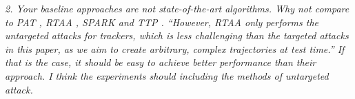 \documentclass[12pt]{article}
\begin{document}

\textit{2. Your baseline approaches are not state-of-the-art algorithms. Why not compare to PAT \cite{PAT}, RTAA \cite{RTAA}, SPARK \cite{SPARK} and TTP \cite{TTP}. “However, RTAA only performs the untargeted attacks for trackers, which is less challenging than the targeted attacks in this paper, as we aim to create arbitrary, complex trajectories at test time.” If that is the case, it should be easy to achieve better performance than their approach. I think the experiments should including the methods of untargeted attack.}
\end{document}
